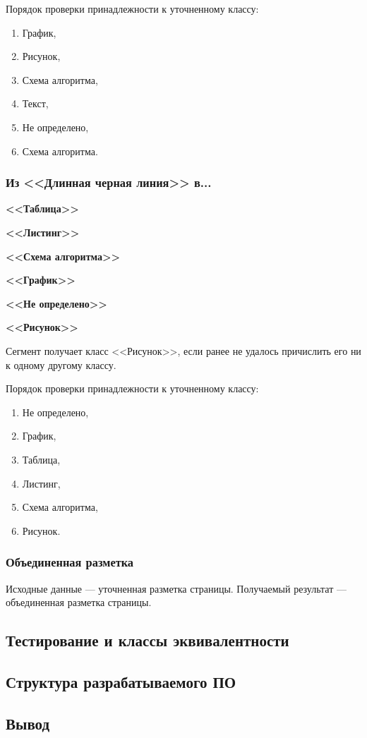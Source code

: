 Порядок проверки принадлежности к уточненному классу:
\begin{enumerate}
    \item График,
    \item Рисунок,
    \item Схема алгоритма,
    \item Текст,
    \item Не определено,
    \item Схема алгоритма.
\end{enumerate}

\subsubsection*{Из <<Длинная черная линия>> в...}

\textbf{<<Таблица>>}

\textbf{<<Листинг>>}

\textbf{<<Схема алгоритма>>}

\textbf{<<График>>}

\textbf{<<Не определено>>}

\textbf{<<Рисунок>>}

Сегмент получает класс <<Рисунок>>, если ранее не удалось причислить его ни к одному другому классу.

Порядок проверки принадлежности к уточненному классу:
\begin{enumerate}
    \item Не определено,
    \item График,
    \item Таблица,
    \item Листинг,
    \item Схема алгоритма,
    \item Рисунок.
\end{enumerate}

\subsubsection{Объединенная разметка}

Исходные данные --- уточненная разметка страницы.
Получаемый результат --- объединенная разметка страницы.




\subsection{Тестирование и классы эквивалентности}

\subsection{Структура разрабатываемого ПО}

\subsection*{Вывод}
